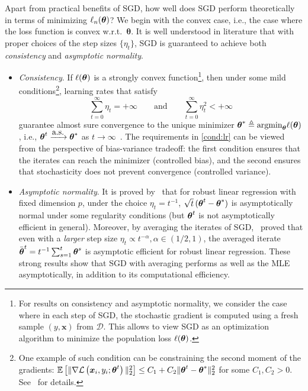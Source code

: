 Apart from practical benefits of SGD, how well does SGD perform theoretically in terms of minimizing $\ell_{n}(\text{\boldmath $\theta$})$? We begin with the convex case, i.e., the case where the loss function is convex w.r.t.~$\bm{\theta}$. It is well understood in literature that with proper choices of the step sizes $\{\eta_{t}\}$, SGD is guaranteed to achieve both \emph{consistency} and \emph{asymptotic normality}.
\begin{itemize}
\item {\emph{Consistency}.} If $\ell(\text{\boldmath $\theta$})$ is a strongly convex function\footnote{For results on consistency and asymptotic normality, we consider the case where in each step of SGD, the stochastic gradient is computed using a fresh sample $(y, \bm{x})$ from $\mathcal{D}$. This allows to view SGD as an optimization algorithm to minimize the population loss $\ell(\text{\boldmath $\theta$})$.}, then under some mild conditions\footnote{One example of such condition can be constraining the second moment of the gradients: $\mathbb{E}\left[\|\nabla\mathcal{L}\left(\bm{x}_{i},y_{i};\text{\boldmath $\theta$}^{t}\right)\|_{2}^{2}\right]\le C_{1}+C_{2}\|\text{\boldmath $\theta$}^{t}-\text{\boldmath $\theta$}^{*}\|_{2}^{2}$ for some $C_{1},C_{2}>0$. See~\cite{bottou1998online} for details.}, learning rates that satisfy
\begin{equation}\label{cond:lr}
\sum_{t=0}^{\infty}\eta_{t}=+\infty\qquad\text{and}\qquad\sum_{t=0}^{\infty}\eta_{t}^{2}<+\infty
\end{equation}
guarantee almost sure convergence to the unique minimizer $\text{\boldmath $\theta$}^* \triangleq \mbox{argmin}_{\text{\boldmath $\theta$}} \ell(\text{\boldmath $\theta$})$, i.e., $\text{\boldmath $\theta$}^{t}\xrightarrow{\mbox{a.s.}}\text{\boldmath $\theta$}^{*}$ as $t\to\infty$~\citep{robbins1951stochastic,kiefer1952stochastic,bottou1998online,kushner2003stochastic}. The requirements in \eqref{cond:lr} can be viewed from the perspective of bias-variance tradeoff: the first condition ensures that the iterates can reach the minimizer (controlled bias), and the second ensures that stochasticity does not prevent convergence (controlled variance).

\item {\emph{Asymptotic normality}.} It is proved by~\cite{polyak1979adaptive} that for robust linear regression with fixed dimension $p$, under the choice $\eta_{t}=t^{-1}$, $\sqrt{t}\,(\text{\boldmath $\theta$}^{t}-\text{\boldmath $\theta$}^{*})$ is asymptotically normal under some regularity conditions (but $\text{\boldmath $\theta$}^{t}$ is not asymptotically efficient in general). Moreover, by averaging the iterates of SGD,~\cite{polyak1992acceleration} proved that even with a \emph{larger} step size $\eta_{t}\propto t^{-\alpha},\alpha\in(1/2,1)$, the averaged iterate $\bar{\text{\boldmath $\theta$}}^{t}=t^{-1}\sum_{s=1}^{t}\text{\boldmath $\theta$}^{s}$ is asymptotic efficient for robust linear regression. These strong results show that SGD with averaging performs as well as the MLE asymptotically, in addition to its computational efficiency. %
\end{itemize}

